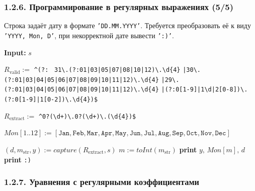 \documentclass[mathserif,12pt,aspectratio=169]{beamer}
\def\Assign{\operatorname{:=}}
\begin{document}
\begin{frame}
\frametitle{1.2.6. Программирование в регулярных выражениях (5/5)}
\begin{example}
Строка задаёт дату в формате
\texttt{'DD.MM.YYYY'}. Требуется преобразовать её к виду \texttt{'YYYY, Mon, D'},
при некорректной дате вывести \texttt{':)'}.
\begin{algorithmic}
\STATE \textbf{Input:} $s$

\STATE $R_{\mathrm{valid}} \Assign$ \texttt{\^{}(?:}
\ \texttt{31\textbackslash.(?:01|03|05|07|08|10|12)\textbackslash.\textbackslash d\{4\}}
\STATE \quad \texttt{|30\textbackslash.(?:01|03|04|05|06|07|08|09|10|11|12)\textbackslash.\textbackslash d\{4\}}
\STATE \quad \texttt{|29\textbackslash.(?:01|03|04|05|06|07|08|09|10|11|12)\textbackslash.\textbackslash d\{4\}}
\STATE \quad \texttt{|(?:0[1-9]|1\textbackslash d|2[0-8])\textbackslash.(?:0[1-9]|1[0-2])\textbackslash.\textbackslash d\{4\}}\texttt{)\$}

\STATE $R_{\mathrm{extract}} \Assign$
\texttt{\^{}0?(\textbackslash d+)\textbackslash.0?(\textbackslash d+)\textbackslash.(\textbackslash d\{4\})\$}

\STATE $Mon[1..12] \Assign
[\texttt{Jan},\texttt{Feb},\texttt{Mar},\texttt{Apr},\texttt{May},\texttt{Jun},\texttt{Jul},\texttt{Aug},\texttt{Sep},\texttt{Oct},\texttt{Nov},\texttt{Dec}]$

    \STATE $(d, m_{\mathrm{str}}, y)\Assign capture(R_{\mathrm{extract}}, s)$
    \STATE $m\Assign toInt(m_{\mathrm{str}})$
    \STATE \textbf{print} $y\texttt{, }Mon[m]\texttt{, }d$
\ELSE
    \STATE \textbf{print} \texttt{:)}
\ENDIF
\end{algorithmic}
\end{example}
\end{frame}


\subsubsection{1.2.7. Уравнения с регулярными коэффициентами}\label{1.2.7.}
\end{document}
